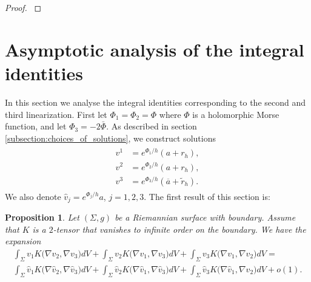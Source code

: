 \documentclass[12pt]{amsart}
\def\p{\partial}
\newtheorem{proposition}[theorem]{Proposition}
\theoremstyle{definition}
\theoremstyle{remark}
\begin{document}
{\begin{proof}
{%
}

\end{proof}
}

\section{Asymptotic analysis of the integral identities}\label{Section_4}
In this section we analyse the integral identities corresponding to the second and third linearization. First let $\Phi_1=\Phi_2=\Phi$ where $\Phi$ is a holomorphic Morse function, and let $\Phi_3=-2\bar\Phi$. As described in section \ref{subsection:choices_of_solutions}, we construct solutions 
 \begin{align*}
 \begin{split}
 v^1&=e^{\Phi_1/h}(a+r_h), \\
 v^2&=e^{\Phi_2/h}(a+r_h), \\
 v^3&=e^{\Phi_3/h}(\overline a+\tilde r_h).
 \end{split}
\end{align*}
 We also denote $\hat v_j=e^{\Phi_j/h}a$, $j=1,2,3$. The first result of this section is:

\begin{proposition}\label{prop:asymptotics_for_the_2nd_lin}
 Let $(\Sigma,g)$ be a Riemannian surface with boundary. 
 Assume that $K$ is a $2$-tensor that vanishes to infinite order on the boundary. We have the expansion
 \begin{multline}
  \int_{\Sigma} v_1 K(\nabla v_2,\nabla v_3\big)dV+\int_{\Sigma}v_2 K(\nabla v_1,\nabla v_3\big)dV+\int_{\Sigma} v_3 K(\nabla v_1,\nabla v_2\big)dV= \\
  \int_{\Sigma} \hat v_1 K(\nabla \hat  v_2,\nabla \hat v_3\big)dV+\int_{\Sigma}\hat v_2 K(\nabla \hat v_1,\nabla \hat v_3\big)dV+\int_{\Sigma}\hat v_3 K(\nabla\hat v_1,\nabla \hat v_2\big)dV+o(1).
 \end{multline}
\end{proposition}
\end{document}
